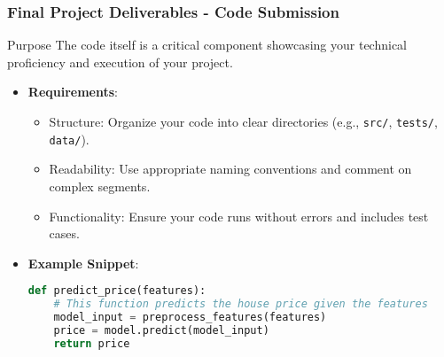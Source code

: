 \documentclass[aspectratio=169]{beamer}
\begin{document}
\begin{frame}[fragile]
    \frametitle{Final Project Deliverables - Code Submission}
    \begin{block}{Purpose}
        The code itself is a critical component showcasing your technical proficiency and execution of your project.
    \end{block}
    \begin{itemize}
        \item \textbf{Requirements}:
        \begin{itemize}
            \item Structure: Organize your code into clear directories (e.g., \texttt{src/}, \texttt{tests/}, \texttt{data/}).
            \item Readability: Use appropriate naming conventions and comment on complex segments.
            \item Functionality: Ensure your code runs without errors and includes test cases.
        \end{itemize}
        \item \textbf{Example Snippet}:
        \begin{lstlisting}[language=Python]
def predict_price(features):
    # This function predicts the house price given the features
    model_input = preprocess_features(features)
    price = model.predict(model_input)
    return price
        \end{lstlisting}
    \end{itemize}
\end{frame}
\end{document}
